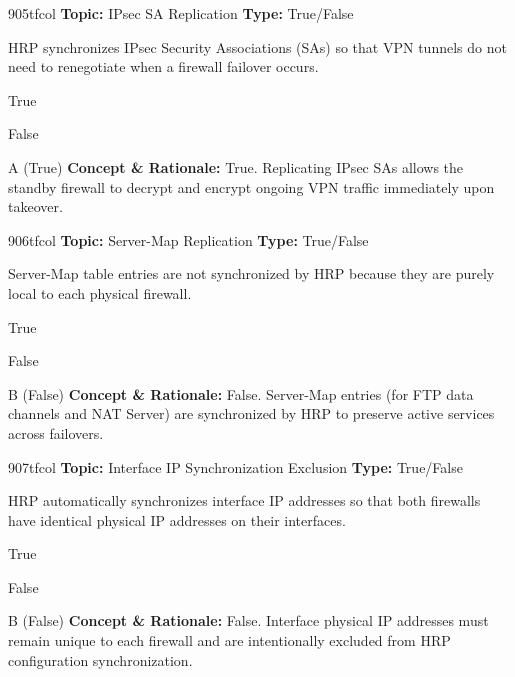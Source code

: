 \begin{qcard}{905}{tfcol}
\textcolor{darkslate!75}{\small\textbf{Topic:} IPsec SA Replication \hfill \textbf{Type:} True/False}\vspace{0.4em}\par
HRP synchronizes IPsec Security Associations (SAs) so that VPN tunnels do not need to renegotiate when a firewall failover occurs.
\begin{qoptions}
\item True
\item False
\end{qoptions}
\end{qcard}
\nopagebreak
\begin{explainbox}{A (True)}
\textbf{Concept \& Rationale:} True. Replicating IPsec SAs allows the standby firewall to decrypt and encrypt ongoing VPN traffic immediately upon takeover.
\end{explainbox}

\begin{qcard}{906}{tfcol}
\textcolor{darkslate!75}{\small\textbf{Topic:} Server-Map Replication \hfill \textbf{Type:} True/False}\vspace{0.4em}\par
Server-Map table entries are not synchronized by HRP because they are purely local to each physical firewall.
\begin{qoptions}
\item True
\item False
\end{qoptions}
\end{qcard}
\nopagebreak
\begin{explainbox}{B (False)}
\textbf{Concept \& Rationale:} False. Server-Map entries (for FTP data channels and NAT Server) are synchronized by HRP to preserve active services across failovers.
\end{explainbox}

\begin{qcard}{907}{tfcol}
\textcolor{darkslate!75}{\small\textbf{Topic:} Interface IP Synchronization Exclusion \hfill \textbf{Type:} True/False}\vspace{0.4em}\par
HRP automatically synchronizes interface IP addresses so that both firewalls have identical physical IP addresses on their interfaces.
\begin{qoptions}
\item True
\item False
\end{qoptions}
\end{qcard}
\nopagebreak
\begin{explainbox}{B (False)}
\textbf{Concept \& Rationale:} False. Interface physical IP addresses must remain unique to each firewall and are intentionally excluded from HRP configuration synchronization.
\end{explainbox}


